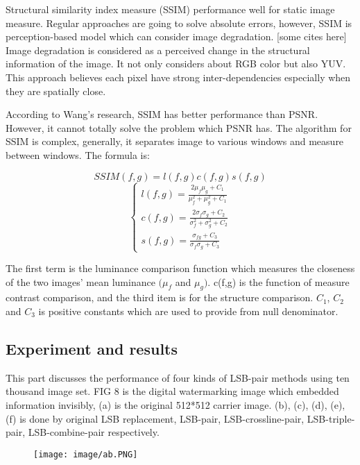 \documentclass[%
    reprint,
    amsmath,amssymb,
    aps,
   ]{revtex4-1}
\begin{document}
   Structural similarity index measure (SSIM) performance well for static image measure. Regular approaches are going to solve absolute errors, however, SSIM is perception-based model which can consider image degradation. [some cites here] Image degradation is considered as a perceived change in the structural information of the image. It not only considers about RGB color but also YUV. This approach believes each pixel have strong inter-dependencies especially when they are spatially close.
   
   According to Wang’s research, SSIM has better performance than PSNR. However, it cannot totally solve the problem which PSNR has. \cite{wang2005structural} The algorithm for SSIM is complex, generally, it separates image to various windows and measure between windows. The formula is:
   
   \[SSIM ( f ,g ) = l ( f ,g )c ( f ,g )s ( f ,g )\]
   $$\begin{cases} l(f,g) = \frac{2\mu_{f}\mu_{g} + C_{1}}{\mu^2_{f} + \mu^2_{g} + C_{1}}\\ 
   c(f,g) = \frac{2\sigma_{f}\sigma_{g} + C_{2}}{\sigma^2_{f} + \sigma^2_{g} + C_{2}}\\
   s(f,g) = \frac{\sigma_{fg} + C_{3}}{\sigma_{f}\sigma_{g} + C_{3}}
   \end{cases}$$
   
   The first term is the luminance comparison function which measures the closeness of the two images’ mean luminance \((\mu_{f}\)  and \(\mu_{g})\). c(f,g) is the function of measure contrast comparison, and the third item is for the structure comparison. \(C_{1}\), \(C_{2}\) and \(C_{3}\) is positive constants which are used to provide from null denominator.
   
   
   \subsection{\label{sec:level2}Experiment and results}
   
   This part discusses the performance of four kinds of LSB-pair methods using ten thousand image set. FIG 8 is the digital watermarking image which embedded information invisibly, (a) is the original 512*512 carrier image. (b), (c), (d), (e), (f) is done by original LSB replacement, LSB-pair, LSB-crossline-pair, LSB-triple-pair, LSB-combine-pair respectively. 
   
   
   \begin{figure}[h]
   \texttt{[image: image/ab.PNG]}
   \label{fig:figure}
   \end{figure} 
   
\end{document}
